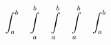 \documentclass{book}
\begin{document}
$$
\int^{b}_{a}\quad
\mathop{\int}^{b}_{a}\quad
\int\limits^{b}_{a}\quad
\intop^{b}_{a}\quad
\intop\nolimits^{b}_{a}$$
\end{document}
